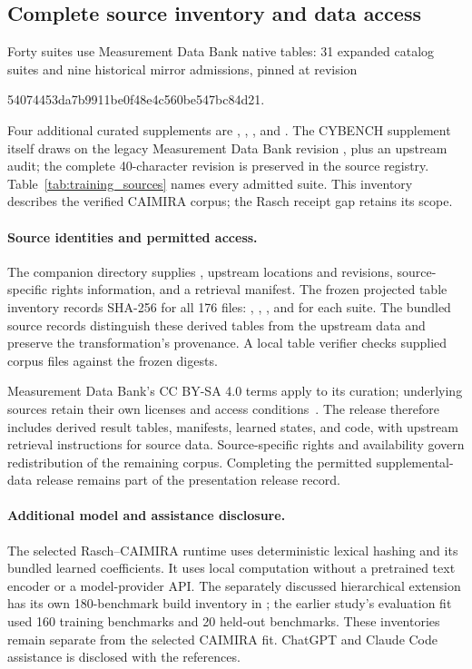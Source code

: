 \clearpage
\subsection{Complete source inventory and data access}
Forty suites use Measurement Data Bank native tables: 31 expanded catalog suites and nine historical mirror admissions, pinned at revision
\begin{center}\small\ttfamily
54074453da7b9911be0f48e4c560be547bc84d21.
\end{center}
Four additional curated supplements are , , , and . The CYBENCH supplement itself draws on the legacy Measurement Data Bank revision , plus an upstream audit; the complete 40-character revision is preserved in the source registry. Table~\ref{tab:training_sources} names every admitted suite. This inventory describes the verified CAIMIRA corpus; the Rasch receipt gap retains its scope.



\paragraph{Source identities and permitted access.}
The companion  directory supplies , upstream locations and revisions, source-specific rights information, and a retrieval manifest. The frozen projected table inventory records SHA-256 for all 176 files: , , , and  for each suite. The bundled source records distinguish these derived tables from the upstream data and preserve the transformation's provenance. A local table verifier checks supplied corpus files against the frozen digests.

Measurement Data Bank's CC BY-SA 4.0 terms apply to its curation; underlying sources retain their own licenses and access conditions~\citep{measurementdb2026}. The release therefore includes derived result tables, manifests, learned states, and code, with upstream retrieval instructions for source data. Source-specific rights and availability govern redistribution of the remaining corpus. Completing the permitted supplemental-data release remains part of the presentation release record.

\paragraph{Additional model and assistance disclosure.}
The selected Rasch--CAIMIRA runtime uses deterministic lexical hashing and its bundled learned coefficients. It uses local computation without a pretrained text encoder or a model-provider API. The separately discussed hierarchical extension has its own 180-benchmark build inventory in ; the earlier study's evaluation fit used 160 training benchmarks and 20 held-out benchmarks. These inventories remain separate from the selected CAIMIRA fit. ChatGPT and Claude Code assistance is disclosed with the references.
